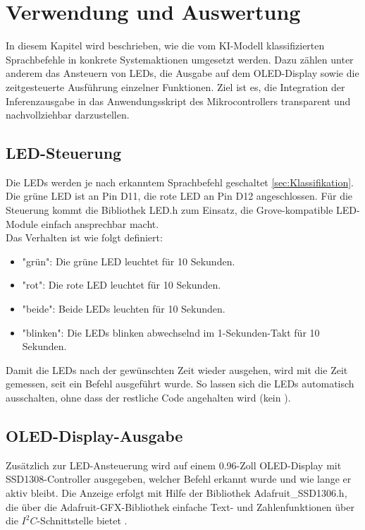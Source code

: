 \section{Verwendung und Auswertung} \label{sec:Verwendung und Auswertung}

In diesem Kapitel wird beschrieben, wie die vom KI-Modell klassifizierten Sprachbefehle in konkrete Systemaktionen umgesetzt werden. Dazu zählen unter anderem das Ansteuern von LEDs, die Ausgabe auf dem OLED-Display sowie die zeitgesteuerte Ausführung einzelner Funktionen. Ziel ist es, die Integration der Inferenzausgabe in das Anwendungsskript des Mikrocontrollers transparent und nachvollziehbar darzustellen.

\subsection{LED-Steuerung}

Die LEDs werden je nach erkanntem Sprachbefehl geschaltet \ref{sec:Klassifikation}. Die grüne LED ist an Pin D11, die rote LED an Pin D12 angeschlossen. Für die Steuerung kommt die Bibliothek LED.h zum Einsatz, die Grove-kompatible LED-Module einfach ansprechbar macht.\\
\bigskip
Das Verhalten ist wie folgt definiert:

\begin{itemize}
    \item "grün": Die grüne LED leuchtet für 10 Sekunden.
    
    \item "rot": Die rote LED leuchtet für 10 Sekunden.
    
    \item "beide": Beide LEDs leuchten für 10 Sekunden.
    
    \item "blinken": Die LEDs blinken abwechselnd im 1-Sekunden-Takt für 10 Sekunden.
\end{itemize}

Damit die LEDs nach der gewünschten Zeit wieder ausgehen, wird mit  die Zeit gemessen, seit ein Befehl ausgeführt wurde. So lassen sich die LEDs automatisch ausschalten, ohne dass der restliche Code angehalten wird (kein ).

\subsection{OLED-Display-Ausgabe}

Zusätzlich zur LED-Ansteuerung wird auf einem 0.96-Zoll OLED-Display mit SSD1308-Controller ausgegeben, welcher Befehl erkannt wurde und wie lange er aktiv bleibt. Die Anzeige erfolgt mit Hilfe der Bibliothek Adafruit\_SSD1306.h, die über die Adafruit-GFX-Bibliothek einfache Text- und Zahlenfunktionen über die $I^2C$-Schnittstelle bietet \cite{Adafruit_SSD1306}.\\

